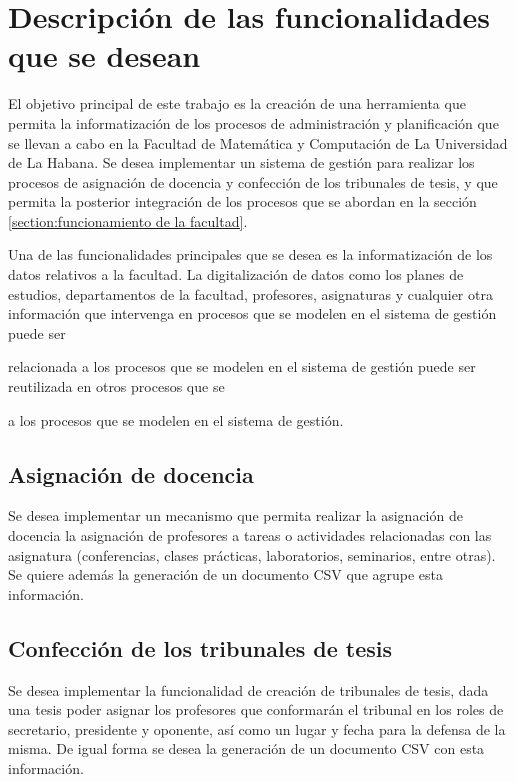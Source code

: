 \chapter{Descripción de las funcionalidades que se desean}\label{chapter:features}
El objetivo principal de este trabajo es la creación de
una herramienta que permita la informatización de los procesos
de administración y planificación que se llevan a cabo en la Facultad de Matemática y Computación
de La Universidad de La Habana. 
Se desea implementar un sistema de 
gestión para realizar los procesos de asignación de docencia y 
confección de los tribunales de tesis, y que permita 
la posterior integración de los procesos que se abordan en la 
sección \ref{section:funcionamiento de la facultad}.





Una de las funcionalidades principales que se desea es la informatización
de los datos relativos a la facultad. La digitalización de datos como 
los planes de estudios, departamentos de la facultad, profesores, asignaturas 
y cualquier otra información que intervenga en procesos que se modelen en el sistema 
de gestión puede ser 


relacionada a los procesos que se modelen en el sistema de gestión puede ser 
reutilizada en otros procesos que se  


a los procesos que se modelen en el sistema de gestión.







\section{Asignación de docencia}
Se desea implementar un mecanismo que permita realizar
la asignación de docencia
la asignación
de profesores a tareas o actividades relacionadas
con las asignatura (conferencias, clases prácticas,
laboratorios, seminarios, entre otras).
Se quiere además la generación de un documento
CSV que agrupe esta información.


\section{Confección de los tribunales de tesis}
Se desea implementar la funcionalidad de creación
de tribunales de tesis, dada una tesis poder asignar
los profesores que conformarán el tribunal en los
roles de secretario, presidente y oponente, así como
un lugar y fecha para la defensa de la misma. De igual
forma se desea la generación de un documento CSV con
esta información.
